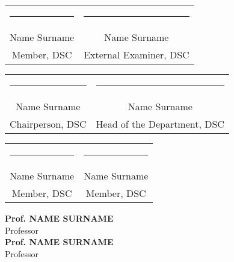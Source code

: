 \documentclass{report}
\begin{document}
\vspace*{0.5cm}
\renewcommand{\arraystretch}{0.5}
\setlength{\tabcolsep}{30pt}
\begin{center}
\begin{tabular}{c c}
\par\noindent\rule{6cm}{0.5pt} & \par\noindent\rule{6cm}{0.5pt}\\
\LARGE{Name Surname} & \LARGE{Name Surname}\\
\Large{Member, DSC}  & \Large{External Examiner, DSC}
\end{tabular}
\end{center}
\vspace*{0.5cm}
\renewcommand{\arraystretch}{0.5}
\setlength{\tabcolsep}{30pt}
\begin{center}
\begin{tabular}{c c}
\par\noindent\rule{6cm}{0.5pt} & \par\noindent\rule{6cm}{0.5pt}\\
\LARGE{Name Surname} & \LARGE{Name Surname}\\
\Large{Chairperson, DSC}  & \Large{Head of the Department, DSC}
\end{tabular}
\end{center}
\vspace*{0.5cm}
\renewcommand{\arraystretch}{0.5}
\setlength{\tabcolsep}{30pt}
\begin{center}
\begin{tabular}{c c}
\par\noindent\rule{6cm}{0.5pt} & \par\noindent\rule{6cm}{0.5pt}\\
\LARGE{Name Surname} & \LARGE{Name Surname}\\
\Large{Member, DSC}  & \Large{Member, DSC}
\end{tabular}
\end{center}
\vspace*{2cm}
\begin{center}
\renewcommand{\arraystretch}{0.5}

\end{center}


\newpage
\thispagestyle{empty}
\vspace*{1cm}
\begin{flushleft}
\LARGE{\textbf{Prof. NAME SURNAME}\\
Professor\\
\vspace*{0.5cm}
\textbf{Prof. NAME SURNAME}\\
Professor}
\end{flushleft}
\end{document}
